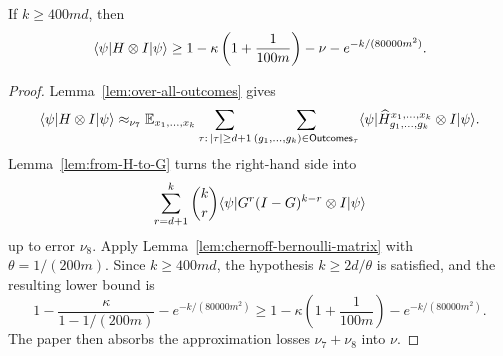 \begin{corollary}\label{cor:ld-pasting-N-completeness}
	\leanok
	If $k \ge 400md$, then
	\[
		\langle \psi \rvert H \otimes I \lvert \psi \rangle
		\ge
		1 - \kappa\left(1+\frac{1}{100m}\right) - \nu - e^{-k/(80000m^2)}.
	\]
\end{corollary}
\begin{proof}
	\leanok
	Lemma~\ref{lem:over-all-outcomes} gives
	\[
		\langle \psi \rvert H \otimes I \lvert \psi \rangle
		\approx_{\nu_7}
		\mathbb{E}_{x_1,\dots,x_k} \sum_{\tau:\,|\tau|\ge d+1} \sum_{(g_1,\dots,g_k)\in \mathsf{Outcomes}_\tau}
		\langle \psi \rvert \widehat H_{g_1,\dots,g_k}^{x_1,\dots,x_k} \otimes I \lvert \psi \rangle.
	\]
	Lemma~\ref{lem:from-H-to-G} turns the right-hand side into
	\[
		\sum_{r=d+1}^k \binom{k}{r} \langle \psi \rvert G^r(I-G)^{k-r} \otimes I \lvert \psi \rangle
	\]
	up to error $\nu_8$. Apply Lemma~\ref{lem:chernoff-bernoulli-matrix} with $\theta = 1/(200m)$. Since $k\ge 400md$, the hypothesis $k \ge 2d/\theta$ is satisfied, and the resulting lower bound is
	\[
		1 - \frac{\kappa}{1-1/(200m)} - e^{-k/(80000m^2)}
		\ge
		1 - \kappa\left(1+\frac{1}{100m}\right) - e^{-k/(80000m^2)}.
	\]
	The paper then absorbs the approximation losses $\nu_7+\nu_8$ into $\nu$.
\end{proof}
